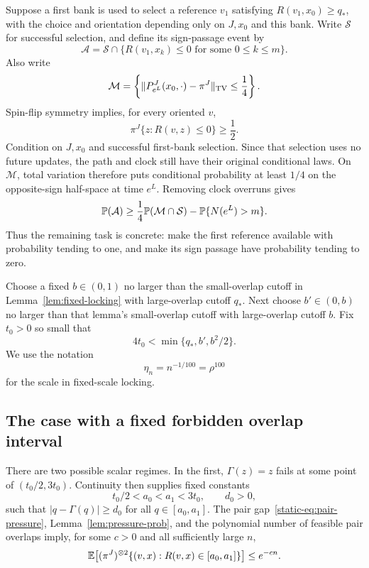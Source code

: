 Suppose a first bank is used to select a reference $v_1$ satisfying
$R(v_1,x_0)\geq q_*$, with the choice and orientation depending only on
$J,x_0$ and this bank. Write $\mathcal S$ for successful selection, and
define its sign-passage event by
\[
 \mathcal A=\mathcal S\cap
 \{R(v_1,x_k)\leq0\text{ for some }0\leq k\leq m\}.
\]
Also write
\[
 \mathcal M=\left\{
 \lVert P_{e^L}^J(x_0,\cdot)-\pi^J\rVert_{\mathrm{TV}}\leq\frac14\right\}.
\]
Spin-flip symmetry implies, for every oriented $v$,
\[
 \pi^J\{z:R(v,z)\leq0\}\geq\frac12.
\]
Condition on $J,x_0$ and successful first-bank selection. Since that
selection uses no future updates, the path and clock still have their
original conditional laws. On $\mathcal M$, total variation therefore
puts conditional probability at least $1/4$ on the opposite-sign
half-space at time $e^L$. Removing clock overruns gives
\begin{equation}\label{eq:dyn-tv-bridge}
 \mathbb P(\mathcal A)\geq
 \frac14\mathbb P(\mathcal M\cap\mathcal S)
 -\mathbb P\{N(e^L)>m\}.
\end{equation}
Thus the remaining task is concrete: make the first reference available
with probability tending to one, and make its sign passage have
probability tending to zero.

Choose a fixed $b\in(0,1)$ no larger than the small-overlap cutoff in
Lemma~\ref{lem:fixed-locking} with large-overlap cutoff $q_*$. Next choose
$b'\in(0,b)$ no larger than that lemma's small-overlap cutoff with
large-overlap cutoff $b$. Fix $t_0>0$ so small that
\begin{equation}\label{eq:dyn-t0-choice}
 4t_0<\min\{q_*,b',b^2/2\}.
\end{equation}
We use the notation
\begin{equation}\label{eq:dyn-fixed-error}
 \eta_n=n^{-1/100}=\rho^{100}
\end{equation}
for the scale in fixed-scale locking.

\subsection{The case with a fixed forbidden overlap interval}

There are two possible scalar regimes. In the first,
$\Gamma(z)=z$ fails at some point of $(t_0/2,3t_0)$. Continuity then
supplies fixed constants
\[
 t_0/2<a_0<a_1<3t_0,\qquad d_0>0,
\]
such that $|q-\Gamma(q)|\geq d_0$ for all $q\in[a_0,a_1]$.
The pair gap~\eqref{static-eq:pair-pressure},
Lemma~\ref{lem:pressure-prob}, and the polynomial number of feasible pair
overlaps imply, for some $c>0$ and all sufficiently large $n$,
\begin{equation}\label{eq:dyn-fixed-forbidden}
 \mathbb E\big[(\pi^J)^{\otimes2}
       \{(v,x):R(v,x)\in[a_0,a_1]\}\big]\leq e^{-cn}.
\end{equation}

